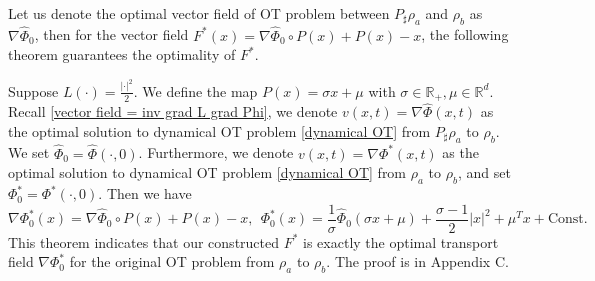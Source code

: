 \documentclass{article}
\newcommand{\chen}[1]{\textcolor{cyan}{#1}}
\newtheorem{theorem}{Theorem}
\newenvironment{manualtheorem}[1]{%
  \renewcommand\themanualtheoreminner{#1}%
  \manualtheoreminner
}{\endmanualtheoreminner}
\begin{document}
Let us denote the optimal vector field of OT problem between $P_{\sharp}\rho_a$ and $\rho_b$ as $\nabla\widehat{\Phi}_0$, then for the vector field ${F}^*(x) = \nabla\widehat{\Phi}_0 \circ P(x) + P(x) - x $, the following theorem guarantees the optimality of ${F}^*$.
\begin{manualtheorem}{3}
\label{theorem on preconditioning}
 Suppose $L(\cdot)=\frac{|\cdot|^2}{2}$. We define the map $P(x)=\sigma x+\mu$ with $\sigma\in\mathbb{R}_+, \mu\in\mathbb{R}^d$. Recall \eqref{vector field = inv grad L grad Phi}, we denote ${v}(x,t)=\nabla\widehat{\Phi}(x, t)$ as the optimal solution to dynamical OT problem \eqref{dynamical OT} from $P_{\sharp}\rho_a$ to $\rho_b$. We set $\widehat{\Phi}_0 = \widehat{\Phi}(\cdot, 0)$. Furthermore, we denote ${v}(x,t)=\nabla\Phi^*(x,t)$ as the optimal solution to dynamical OT problem \eqref{dynamical OT} from $\rho_a$ to $\rho_b$,
 and set $\Phi^*_0=\Phi^*(\cdot, 0)$. Then we have
  \begin{equation*}
     \nabla\Phi^*_0(x) = \nabla\widehat{\Phi}_0\circ P(x)+P(x)-x,
~~\Phi^*_0(x) = \frac{1}{\sigma}\widehat{\Phi}_0(\sigma x + \mu)+\frac{\sigma - 1}{2}|x|^2 + \mu^Tx+\textrm{Const}.
\end{equation*}
\end{manualtheorem}
This theorem indicates that our constructed ${F}^*$ is exactly the optimal transport field $\nabla\Phi^*_0$ for the original OT problem from $\rho_a$ to $\rho_b$. The proof is in Appendix C.
\end{document}
